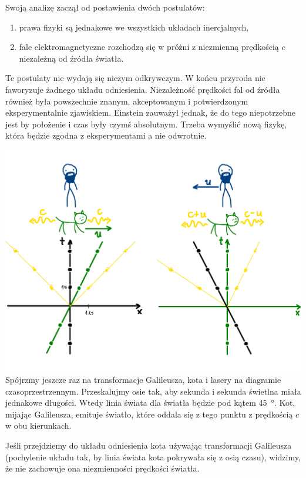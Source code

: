 \documentclass[10pt,twocolumn,fleqn,polish]{article}
\begin{document}
Swoją analizę zaczął od postawienia dwóch postulatów:
\begin{enumerate}
  \item prawa fizyki są jednakowe we wszystkich układach inercjalnych,
  \item fale elektromagnetyczne rozchodzą się w próżni z niezmienną prędkością
        $c$ niezależną od źródła światła.
\end{enumerate}
Te postulaty nie wydają się niczym odkrywczym. W końcu przyroda nie faworyzuje
żadnego układu odniesienia. Niezależność prędkości fal od źródła również była
powszechnie znanym, akceptowanym i potwierdzonym eksperymentalnie zjawiskiem.
Einstein zauważył jednak, że do tego niepotrzebne jest by położenie i czas były
czymś absolutnym. Trzeba wymyślić nową fizykę, która będzie zgodna z eksperymentami
a nie odwrotnie.
\newpage

\noindent\includegraphics[width=1\linewidth]{pages/STA-page19}
Spójrzmy jeszcze raz na transformacje Galileusza, kota i lasery na diagramie
czasoprzestrzennym. Przeskalujmy osie tak, aby sekunda i sekunda świetlna miała
jednakowe długości. Wtedy linia świata dla światła będzie pod kątem \SI{45}{\degree}.
Kot, mijając Galileusza, emituje światło, które oddala się z tego punktu z
prędkością $c$ w obu kierunkach.

Jeśli przejdziemy do układu odniesienia kota używając transformacji Galileusza
(pochylenie układu tak, by linia świata kota pokrywała się z osią czasu),
widzimy, że nie zachowuje ona niezmienności prędkości światła.
\newpage
\end{document}
